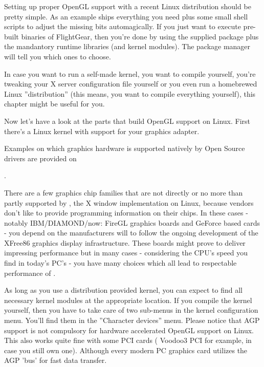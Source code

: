 Setting up proper OpenGL support with a recent Linux distribution should be
pretty simple. As an example  ships everything you need plus some small
shell scripts to adjust the missing bits automagically. If you just want to
execute pre-built binaries of FlightGear, then you're done by using the
supplied \FlightGear{} package plus the mandantory runtime libraries (and
kernel modules). The package manager will tell you which ones to choose.

In case you want to run a self-made kernel, you want to compile \FlightGear{}
yourself, you're tweaking your X server configuration file yourself or you
even run a homebrewed Linux ''distribution'' (this means, you want to compile
everything yourself), this chapter might be useful for you.

Now let's have a look at the parts that build OpenGL support on Linux. First
there's a Linux kernel with support for your graphics adapter.

Examples on which graphics hardware is supported natively by Open Source
drivers are provided on
\medskip

\noindent
{}.
\medskip

There are a few graphics chip families that are not directly or no more than
partly supported by , the X window implementation on Linux, because
vendors don't like to provide programming information on their chips. In
these cases - notably IBM/DIAMOND/now:  FireGL graphics boards and 
GeForce based cards - you depend on the manufacturers will to follow the
ongoing development of the XFree86 graphics display infrastructure. These
boards might prove to deliver impressing performance but in many cases -
considering the CPU's speed you find in today's PC's - you have many choices
which all lead to respectable performance of \FlightGear{}.

As long as you use a distribution provided kernel, you can expect to find
all necessary kernel modules at the appropriate location. If you compile the
kernel yourself, then you have to take care of two sub-menus in the kernel
configuration menu. You'll find them in the ''Character devices'' menu.
Please notice that AGP support is not compulsory for hardware accelerated
OpenGL support on Linux. This also works quite fine with some PCI cards
( Voodoo3 PCI for example, in case you still own one). Although every
modern PC graphics card utilizes the AGP 'bus' for fast data transfer.

